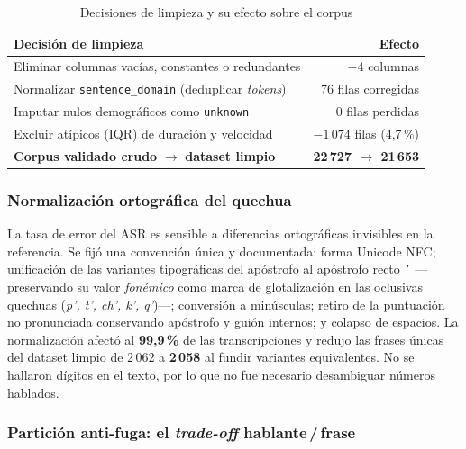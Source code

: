 \begin{table}[H]
  \centering
  \caption{Decisiones de limpieza y su efecto sobre el corpus}
  \label{tab:eda-limpieza}
  \small
  \begin{tabularx}{\linewidth}{@{}X r@{}}
    \toprule
    Decisi\'on de limpieza & Efecto \\
    \midrule
    Eliminar columnas vac\'ias, constantes o redundantes & $-4$ columnas \\
    Normalizar \texttt{sentence\_domain} (deduplicar \emph{tokens}) & 76 filas corregidas \\
    Imputar nulos demogr\'aficos como \texttt{unknown} & 0 filas perdidas \\
    Excluir at\'ipicos (IQR) de duraci\'on y velocidad & $-1\,074$ filas (4,7\,\%) \\
    \midrule
    \textbf{Corpus validado crudo} $\rightarrow$ \textbf{dataset limpio} & \textbf{22\,727 $\rightarrow$ 21\,653} \\
    \bottomrule
  \end{tabularx}
\end{table}

\subsubsection{Normalizaci\'on ortogr\'afica del quechua}
\label{sec:eda-normalizacion}

La tasa de error del ASR es sensible a diferencias ortogr{\'a}ficas invisibles en la
referencia. Se fij{\'o} una convenci{\'o}n {\'u}nica y documentada: forma Unicode NFC;
unificaci{\'o}n de las variantes tipogr{\'a}ficas del ap{\'o}strofo al ap{\'o}strofo recto
\texttt{'} ---preservando su valor \emph{fon{\'e}mico} como marca de glotalizaci{\'o}n en
las oclusivas quechuas (\emph{p', t', ch', k', q'})---; conversi{\'o}n a min{\'u}sculas;
retiro de la puntuaci{\'o}n no pronunciada conservando ap{\'o}strofo y gui{\'o}n internos; y
colapso de espacios. La normalizaci{\'o}n afect{\'o} al \textbf{99,9\,\%} de las
transcripciones y redujo las frases {\'u}nicas del dataset limpio de 2\,062 a \textbf{2\,058}
al fundir variantes equivalentes. No se hallaron d{\'i}gitos en el texto, por lo que no fue
necesario desambiguar n{\'u}meros hablados.

\subsubsection{Partici\'on anti-fuga: el \emph{trade-off} hablante\,/\,frase}
\label{sec:eda-particion}

